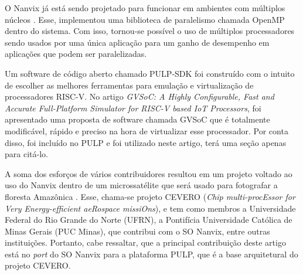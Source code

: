 O Nanvix já está sendo projetado para funcionar em ambientes com múltiplos núcleos \cite{MSC-Reinaldo}. Esse, implementou uma biblioteca de paralelismo chamada 
OpenMP dentro do sistema. Com isso, tornou-se possível o uso de múltiplos processadores sendo usados por uma única aplicação para um ganho de desempenho em aplicações 
que podem ser paralelizadas.

Um software de código aberto chamado PULP-SDK foi construído com o intuito de escolher as melhores ferramentas para emulação e virtualização de processadores RISC-V. 
No artigo \emph{GVSoC: A Highly Configurable, Fast and Accurate Full-Platform Simulator for RISC-V based IoT Processors}, foi apresentado uma proposta de software chamada
GVSoC que é totalmente modificável, rápido e preciso na hora de virtualizar esse processador. Por conta disso, foi incluído no PULP e foi utilizado neste artigo, terá
uma seção apenas para citá-lo.

A soma dos esforços de vários contribuidores resultou em um projeto voltado ao uso do Nanvix dentro de um microssatélite que será usado 
para fotografar a floresta Amazônica \cite{RepoCervero}. Esse, chama-se projeto CEVERO (\emph{Chip multi-procEssor for Very Energy-efficient aeRospace missiOns}), e tem 
como membros a Universidade Federal do Rio Grande do Norte (UFRN), a Pontifícia Universidade Católica de Minas Gerais (PUC Minas), que contribui com o SO Nanvix, entre outras instituições. Portanto, cabe ressaltar, que a principal contribuição deste artigo está no \textit{port} do SO Nanvix para a plataforma PULP, que é a base arquitetural do projeto CEVERO.
